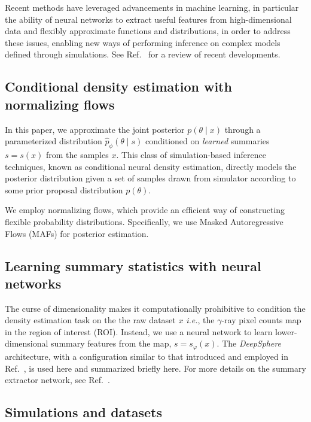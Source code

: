 \documentclass[prd,aps,10pt,nofootinbib,twocolumn,superscriptaddress,preprintnumbers,balancelastpage,longbibliography]{revtex4-1}
\begin{document}
Recent methods have leveraged advancements in machine learning, in particular the ability of neural networks to extract useful features from high-dimensional data and flexibly approximate functions and distributions, in order to address these issues, enabling new ways of performing inference on complex models defined through simulations. See Ref.~\cite{cranmer2020frontier} for a review of recent developments.

\subsection{Conditional density estimation with normalizing flows}

In this paper, we approximate the joint posterior $p(\theta\mid x)$ through a parameterized distribution $\hat p_\phi(\theta\mid s)$ conditioned on \emph{learned} summaries $s=s(x)$ from the samples $x$. This class of simulation-based inference techniques, known as conditional neural density estimation, directly models the posterior distribution given a set of samples drawn from simulator according to some prior proposal distribution $p(\theta)$.

We employ normalizing flows, which provide an efficient way of constructing flexible probability distributions. Specifically, we use Masked Autoregressive Flows (MAFs) for posterior estimation.

\subsection{Learning summary statistics with neural networks}

The curse of dimensionality makes it computationally prohibitive to condition the density estimation task on the the raw dataset $x$ \emph{i.e.}, the $\gamma$-ray pixel counts map in the region of interest (ROI). Instead, we use a neural network to learn lower-dimensional summary features from the map, $s = s_\varphi(x)$. The \emph{DeepSphere}~\cite{defferrard2020deepsphere,Perraudin:2018rbt} architecture, with a configuration similar to that introduced and employed in Ref.~\cite{List:2020mzd}, is used here and summarized briefly here. For more details on the summary extractor network, see Ref.~\cite{List:2020mzd}.

\subsection{Simulations and datasets}
\end{document}
